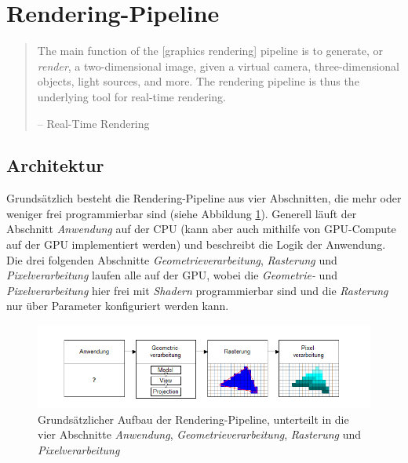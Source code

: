 \documentclass[oneside]{ausarbeitung}
\begin{document}
\section{Rendering-Pipeline}
\label{sec:render_pipeline}
\begin{quote}
The main function of the [graphics rendering] pipeline is to generate, or \textit{render}, a two-dimensional image, given a virtual camera, three-dimensional objects, light sources, and more. The rendering pipeline is thus the underlying tool for real-time rendering.

-- Real-Time Rendering \cite[S. 11]{real_time_rendering}
\end{quote}


\subsection{Architektur}
Grundsätzlich besteht die Rendering-Pipeline aus vier Abschnitten, die mehr oder weniger frei programmierbar sind (siehe Abbildung \ref{fig:render_pipeline}). Generell läuft der Abschnitt \textit{Anwendung} auf der \ac{CPU} (kann aber auch mithilfe von \ac{GPU}-Compute auf der \ac{GPU} implementiert werden) und beschreibt die Logik der Anwendung. Die drei folgenden Abschnitte \textit{Geometrieverarbeitung}, \textit{Rasterung} und \textit{Pixelverarbeitung} laufen alle auf der \ac{GPU}, wobei die \textit{Geometrie-} und \textit{Pixelverarbeitung} hier frei mit \textit{Shadern} programmierbar sind und die \textit{Rasterung} nur über Parameter konfiguriert werden kann.

\begin{figure}
    \includegraphics[width=\textwidth]{images/render_pipeline.png}
    \caption{Grundsätzlicher Aufbau der Rendering-Pipeline, unterteilt in die vier Abschnitte \textit{Anwendung}, \textit{Geometrieverarbeitung}, \textit{Rasterung} und \textit{Pixelverarbeitung}}
    \label{fig:render_pipeline}
\end{figure}
\end{document}
